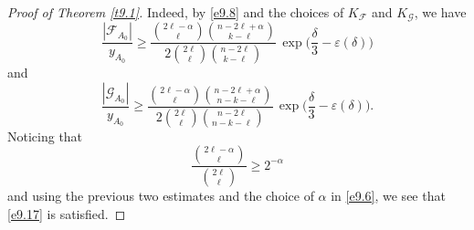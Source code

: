\documentclass[10pt,a4paper]{amsart}
\theoremstyle{remark}
\newcommand{\meg}{\geqslant}
\newcommand{\Fcal}{\mathcal{F}}
\newcommand{\Gcal}{\mathcal{G}}
\begin{document}
\begin{proof}[Proof of Theorem \emph{\ref{t9.1}}]
Indeed, by \eqref{e9.8} and the choices of $K_{\mathcal{F}}$ and $K_{\mathcal{G}}$, we have
\begin{equation} \label{en9.11}
\frac{|\Fcal_{A_0}|}{y_{A_0}}\meg \frac{\binom{2\ell-\alpha}{\ell}\binom{n-2\ell+\alpha}{k-\ell}}{2\binom{2\ell}{\ell}
\binom{n-2\ell}{k-\ell}} \, \exp\Big(\frac{\delta}{3}-\varepsilon(\delta)\Big)
\end{equation}
and
\begin{equation} \label{en9.12}
\frac{|\Gcal_{A_0}|}{y_{A_0}}\meg \frac{\binom{2\ell-\alpha}{\ell}\binom{n-2\ell+\alpha}{n-k-\ell}}{2\binom{2\ell}{\ell}
\binom{n-2\ell}{n-k-\ell}}\, \exp\Big(\frac{\delta}{3}-\varepsilon(\delta)\Big).
\end{equation}
Noticing that
\begin{equation} \label{en9.13}
\frac{\binom{2\ell-\alpha}{\ell}}{\binom{2\ell}{\ell}}\meg 2^{-\alpha}
\end{equation}
and using the previous two estimates and the choice of $\alpha$ in \eqref{e9.6}, we see that \eqref{e9.17} is satisfied.


\end{proof}
\end{document}
